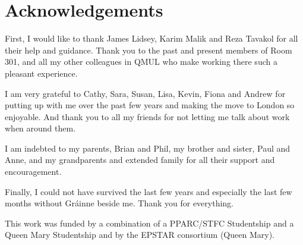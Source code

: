 \renewcommand{\CVSrevision}{\version$Id: acknowledgements.tex,v 1.8 2009/12/07 15:38:13 ith Exp $}
% 
% 
\chapter*{Acknowledgements}
\label{ch:acknowledgements}

First, I would like to thank James Lidsey, Karim Malik and Reza Tavakol for all their help and
guidance. Thank you to the past and present members of Room 301, and all my other colleagues in
QMUL who make working there such a pleasant experience.

I am very grateful to Cathy, Sara, Susan, Lisa, Kevin, Fiona and Andrew for putting up with me over
the past few years and making the move to London so enjoyable. And thank you to all my friends for
not letting me talk about work when around them.

I am indebted to my parents, Brian and Phil, my brother and sister, Paul and Anne, 
and my grandparents and extended family
for all their support and encouragement. 

Finally, I could not have survived the last few years and especially the last few months without 
Gr\'{a}inne beside me. Thank you for everything.

\vfill

This work was funded by a combination of a PPARC/STFC Studentship and a Queen Mary Studentship and
by the EPSTAR consortium (Queen Mary).  


